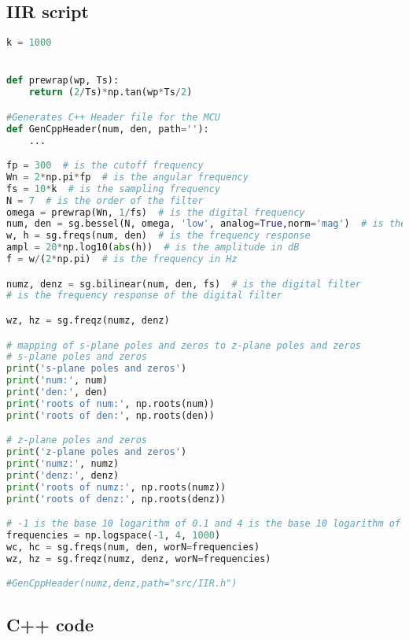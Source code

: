 \subsection{IIR script}


\begin{lstlisting}[language=python, caption=IIR.py]
k = 1000


def prewrap(wp, Ts):
    return (2/Ts)*np.tan(wp*Ts/2)

#Generates C++ Header file for the MCU
def GenCppHeader(num, den, path=''):
    ...

fp = 300  # is the cutoff frequency
Wn = 2*np.pi*fp  # is the angular frequency
fs = 10*k  # is the sampling frequency
N = 7  # is the order of the filter
omega = prewrap(Wn, 1/fs)  # is the digital frequency
num, den = sg.bessel(N, omega, 'low', analog=True,norm='mag')  # is the transfer function
w, h = sg.freqs(num, den)  # is the frequency response
ampl = 20*np.log10(abs(h))  # is the amplitude in dB
f = w/(2*np.pi)  # is the frequency in Hz

numz, denz = sg.bilinear(num, den, fs)  # is the digital filter
# is the frequency response of the digital filter

wz, hz = sg.freqz(numz, denz)

# mapping of s-plane poles and zeros to z-plane poles and zeros
# s-plane poles and zeros
print('s-plane poles and zeros')
print('num:', num)
print('den:', den)
print('roots of num:', np.roots(num))
print('roots of den:', np.roots(den))

# z-plane poles and zeros
print('z-plane poles and zeros')
print('numz:', numz)
print('denz:', denz)
print('roots of numz:', np.roots(numz))
print('roots of denz:', np.roots(denz))

# -1 is the base 10 logarithm of 0.1 and 4 is the base 10 logarithm of 10000
frequencies = np.logspace(-1, 4, 1000)
wc, hc = sg.freqs(num, den, worN=frequencies)
wz, hz = sg.freqz(numz, denz, worN=frequencies)

#GenCppHeader(numz,denz,path="src/IIR.h")

\end{lstlisting}


\subsection{C++ code}

